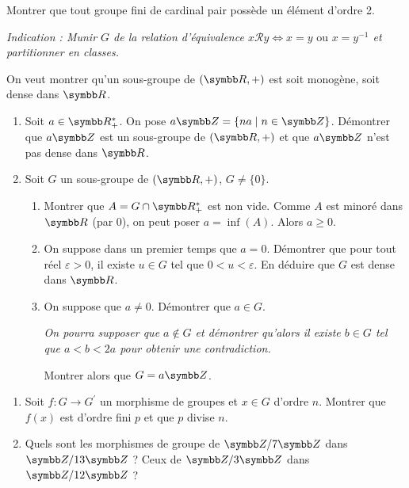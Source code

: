 \begin{exercice}
    Montrer que tout groupe fini de cardinal pair possède un élément d'ordre 2.

    \textit{Indication : Munir $G$ de la relation d'équivalence $x \mathcal{R} y \iff x=y \text{ ou } x=y^{-1}$ et partitionner en classes.}
\end{exercice}

\begin{exercice}
    On veut montrer qu'un sous-groupe de $(\R, +)$ est soit monogène, soit dense dans $\R$.
    \begin{enumerate}
        \item Soit $a\in\R_{+}^*$. On pose $a\Z=\{na \mid n\in\Z\}$. Démontrer que $a\Z$ est un sous-groupe de $(\R,+)$ et que $a\Z$ n'est pas dense dans $\R$.
        \item Soit $G$ un sous-groupe de $(\R, +)$, $G\ne\{0\}$.
        \begin{enumerate}
            \item Montrer que $A=G\cap\R_{+}^{*}$ est non vide. 
                Comme $A$ est minoré dans $\R$ (par 0), on peut poser $a=\inf(A)$. Alors $a\geqslant0$.
            \item On suppose dans un premier temps que $a=0$. Démontrer que pour tout réel $\varepsilon>0$, 
                il existe $u\in G$ tel que $0<u<\varepsilon$. En déduire que $G$ est dense dans $\R$.
            \item On suppose que $a\ne0$. Démontrer que $a\in G$.

            \textit{On pourra supposer que $a \notin G$ et démontrer qu'alors il existe $b\in G$ tel que $a<b<2a$ pour obtenir une contradiction.}
             
            Montrer alors que $G=a\Z$.
        \end{enumerate}
    \end{enumerate}
\end{exercice}

\begin{exercice}
\begin{enumerate}
    \item Soit $f:G\rightarrow G^{\prime}$ un morphisme de groupes et $x\in G$ d'ordre $n$. 
        Montrer que $f(x)$ est d'ordre fini $p$ et que $p$ divise $n$.
    \item Quels sont les morphismes de groupe de $\Z/7\Z$ dans $\Z/13\Z$ ? Ceux de $\Z/3\Z$ dans $\Z/12\Z$ ?
\end{enumerate}
\end{exercice}

